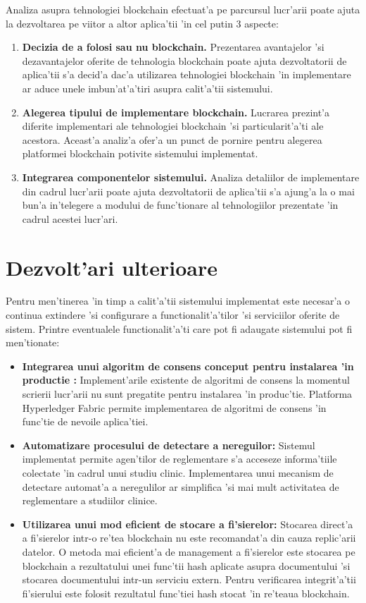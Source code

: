 \documentclass[12pt,a4paper,twoside]{report}
\begin{document}
    Analiza asupra tehnologiei blockchain efectuat'a pe parcursul lucr'arii poate ajuta la dezvoltarea pe viitor a altor aplica'tii 'in cel putin 3 aspecte:
    \begin{enumerate}
        \item \textbf{Decizia de a folosi sau nu blockchain.} Prezentarea avantajelor 'si dezavantajelor oferite de tehnologia blockchain poate ajuta dezvoltatorii de aplica'tii s'a decid'a dac'a utilizarea tehnologiei blockchain 'in implementare ar aduce unele imbun'at'a'tiri asupra calit'a'tii sistemului.
        \item \textbf{Alegerea tipului de implementare blockchain.} Lucrarea prezint'a diferite implementari ale tehnologiei blockchain 'si particularit'a'ti ale acestora. Aceast'a analiz'a ofer'a un punct de pornire pentru alegerea platformei blockchain potivite sistemului implementat.
        \item \textbf{Integrarea componentelor sistemului.} Analiza detaliilor de implementare din cadrul lucr'arii poate ajuta dezvoltatorii de aplica'tii s'a ajung'a la o mai bun'a in'telegere a modului de func'tionare al tehnologiilor prezentate 'in cadrul acestei lucr'ari.
    \end{enumerate}
    
\section{Dezvolt'ari ulterioare}
    Pentru men'tinerea 'in timp a calit'a'tii sistemului implementat este necesar'a o continua extindere 'si configurare a functionalit'a'tilor 'si serviciilor oferite de sistem. Printre eventualele functionalit'a'ti care pot fi adaugate sistemului pot fi men'tionate:
    \begin{itemize}
        \item \textbf{Integrarea unui algoritm de consens conceput pentru instalarea 'in productie :} Implement'arile existente de algoritmi de consens la momentul scrierii lucr'arii nu sunt pregatite pentru instalarea 'in produc'tie. Platforma Hyperledger Fabric permite implementarea de algoritmi de consens 'in func'tie de nevoile aplica'tiei. 
        \item \textbf{Automatizare procesului de detectare a nereguilor:} Sistemul implementat permite agen'tilor de reglementare s'a acceseze informa'tiile colectate 'in cadrul unui studiu clinic. Implementarea unui mecanism de detectare automat'a a neregulilor ar simplifica 'si mai mult activitatea de reglementare a studiilor clinice.
        \item \textbf{Utilizarea unui mod eficient de stocare a fi'sierelor:} Stocarea direct'a a fi'sierelor intr-o re'tea blockchain nu este recomandat'a din cauza replic'arii datelor. O metoda mai eficient'a de management a fi'sierelor este stocarea pe blockchain a rezultatului unei func'tii hash aplicate asupra documentului 'si stocarea documentului intr-un serviciu extern. Pentru verificarea integrit'a'tii fi'sierului este folosit rezultatul func'tiei hash stocat 'in re'teaua blockchain.
    \end{itemize}

 


\end{document}
